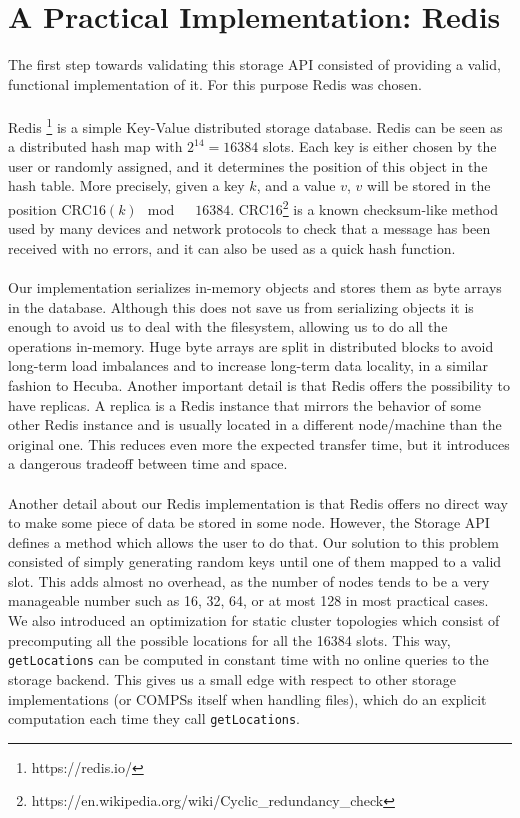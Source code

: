 \section{A Practical Implementation: Redis}
\label{subsec:storage_redis}
The first step towards validating this storage API consisted of providing a valid, functional implementation of it. For this purpose Redis was chosen.\\
\\
Redis \footnote{https://redis.io/} is a simple Key-Value distributed storage database. Redis can be seen as a distributed hash map with $2^{14} = 16384$ slots. Each key is either chosen by the user or randomly assigned, and it determines the position of this object in the hash table. More precisely, given a key $k$, and a value $v$, $v$ will be stored in the position $\textrm{CRC16}(k) \mod \quad 16384$. CRC16\footnote{https://en.wikipedia.org/wiki/Cyclic\_redundancy\_check} is a known checksum-like method used by many devices and network protocols to check that a message has been received with no errors, and it can also be used as a quick hash function.\\
\\
Our implementation serializes in-memory objects and stores them as byte arrays in the database. Although this does not save us from serializing objects it is enough to avoid us to deal with the filesystem, allowing us to do all the operations in-memory. Huge byte arrays are split in distributed blocks to avoid long-term load imbalances and to increase long-term data locality, in a similar fashion to Hecuba. Another important detail is that Redis offers the possibility to have replicas. A replica is a Redis instance that mirrors the behavior of some other Redis instance and is usually located in a different node/machine than the original one. This reduces even more the expected transfer time, but it introduces a dangerous tradeoff between time and space.\\
\\
Another detail about our Redis implementation is that Redis offers no direct way to make some piece of data be stored in some node. However, the Storage API defines a method which allows the user to do that. Our solution to this problem consisted of simply generating random keys until one of them mapped to a valid slot. This adds almost no overhead, as the number of nodes tends to be a very manageable number such as 16, 32, 64, or at most 128 in most practical cases. We also introduced an optimization for static cluster topologies which consist of precomputing all the possible locations for all the 16384 slots. This way, \verb|getLocations| can be computed in constant time with no online queries to the storage backend. This gives us a small edge with respect to other storage implementations (or COMPSs itself when handling files), which do an explicit computation each time they call \verb|getLocations|.\\
